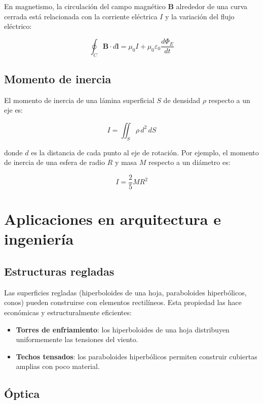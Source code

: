 \documentclass[
]{book}
\providecommand{\tightlist}{%
  \setlength{\itemsep}{0pt}\setlength{\parskip}{0pt}}
\begin{document}
En magnetismo, la circulación del campo magnético \(\mathbf{B}\) alrededor de una curva cerrada está relacionada con la corriente eléctrica \(I\) y la variación del flujo eléctrico:

\[
\oint_C \mathbf{B} \cdot d\mathbf{l} = \mu_0 I + \mu_0 \varepsilon_0 \frac{d\Phi_E}{dt}
\]

\subsection{Momento de inercia}\label{momento-de-inercia}

El momento de inercia de una lámina superficial \(S\) de densidad \(\rho\) respecto a un eje es:

\[
I = \iint_S \rho \, d^2 \, dS
\]

donde \(d\) es la distancia de cada punto al eje de rotación. Por ejemplo, el momento de inercia de una esfera de radio \(R\) y masa \(M\) respecto a un diámetro es:

\[
I = \frac{2}{5}MR^2
\]

\section{Aplicaciones en arquitectura e ingeniería}\label{aplicaciones-en-arquitectura-e-ingenieruxeda}

\subsection{Estructuras regladas}\label{estructuras-regladas}

Las superficies regladas (hiperboloides de una hoja, paraboloides hiperbólicos, conos) pueden construirse con elementos rectilíneos. Esta propiedad las hace económicas y estructuralmente eficientes:

\begin{itemize}
\tightlist
\item
  \textbf{Torres de enfriamiento}: los hiperboloides de una hoja distribuyen uniformemente las tensiones del viento.
\item
  \textbf{Techos tensados}: los paraboloides hiperbólicos permiten construir cubiertas amplias con poco material.
\end{itemize}

\subsection{Óptica}\label{uxf3ptica}
\end{document}
